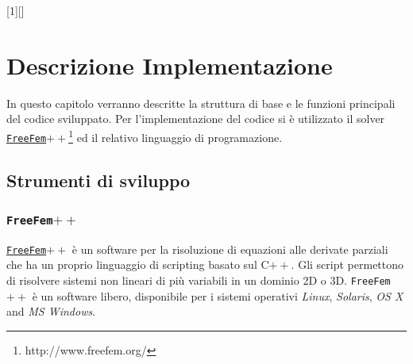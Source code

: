 [1][]{}{}

\section{Descrizione Implementazione}
\label{chap:Code}

In questo capitolo verranno descritte la struttura di base e le funzioni principali del codice sviluppato.
Per l'implementazione del codice si è utilizzato il solver \href{http://www.freefem.org/}\texttt{FreeFem$++$}\footnote{http://www.freefem.org/} ed il relativo linguaggio di programazione.


\subsection{Strumenti di sviluppo}
\subsubsection{\texttt{FreeFem$++$}}
\href{http://www.freefem.org/}\texttt{FreeFem$++$} è un software per la risoluzione di equazioni alle derivate parziali che ha un proprio linguaggio di scripting basato sul C$++$. Gli script permettono di risolvere sistemi non lineari di più variabili in un dominio 2D o 3D.
\texttt{FreeFem$++$} è un software libero, disponibile per i sistemi operativi \textit{Linux}, \textit{Solaris}, \textit{OS X} and \textit{MS Windows}.

